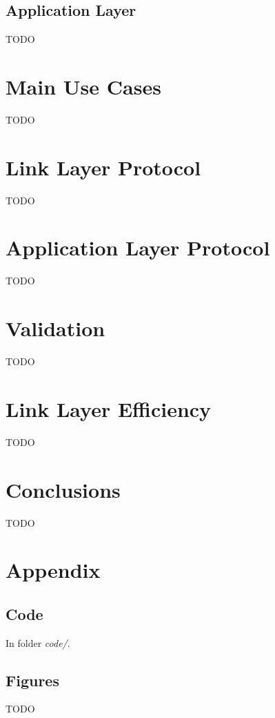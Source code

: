 \documentclass[11pt,a4paper]{article}
\begin{document}
\subsection{Application Layer}

TODO

\section{Main Use Cases}

TODO

\section{Link Layer Protocol}

TODO

\section{Application Layer Protocol}

TODO

\section{Validation}

TODO

\section{Link Layer Efficiency}

TODO

\section{Conclusions}

TODO

\pagebreak
\appendix
\section{Appendix}

\subsection{Code}

In folder \textit{code/}.

\subsection{Figures}

TODO
\end{document}
